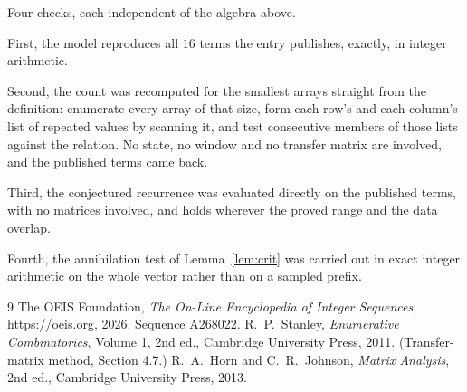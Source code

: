 \documentclass[11pt,a4paper]{article}
\theoremstyle{plain}
\theoremstyle{definition}
\begin{document}
Four checks, each independent of the algebra above.

First, the model reproduces all $16$ terms the entry publishes, exactly, in integer
arithmetic.

Second, the count was recomputed for the smallest arrays straight from the definition:
enumerate every array of that size, form each row's and each column's list of repeated values
by scanning it, and test consecutive members of those lists against the relation. No state, no
window and no transfer matrix are involved, and the published terms came back.

Third, the conjectured recurrence was evaluated directly on the published terms, with no
matrices involved, and holds wherever the proved range and the data overlap.

Fourth, the annihilation test of Lemma~\ref{lem:crit} was carried out in exact integer
arithmetic on the whole vector rather than on a sampled prefix.

\begin{thebibliography}{9}
 The OEIS Foundation, \emph{The On-Line Encyclopedia of Integer
Sequences}, \url{https://oeis.org}, 2026. Sequence A268022.
 R.~P.~Stanley, \emph{Enumerative Combinatorics}, Volume 1, 2nd ed.,
Cambridge University Press, 2011. (Transfer-matrix method, Section 4.7.)
 R.~A.~Horn and C.~R.~Johnson, \emph{Matrix Analysis}, 2nd ed., Cambridge
University Press, 2013.
\end{thebibliography}
\end{document}

